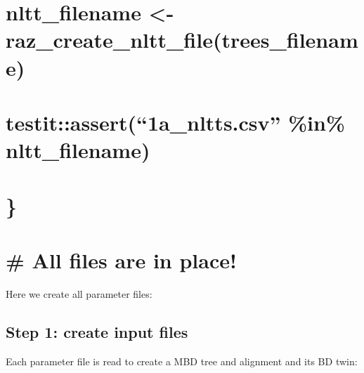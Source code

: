 \documentclass[]{article}
\newenvironment{Shaded}{\begin{snugshade}}{\end{snugshade}}
\newcommand{\KeywordTok}[1]{\textcolor[rgb]{0.13,0.29,0.53}{\textbf{#1}}}
\newcommand{\DecValTok}[1]{\textcolor[rgb]{0.00,0.00,0.81}{#1}}
\newcommand{\StringTok}[1]{\textcolor[rgb]{0.31,0.60,0.02}{#1}}
\newcommand{\ControlFlowTok}[1]{\textcolor[rgb]{0.13,0.29,0.53}{\textbf{#1}}}
\newcommand{\OperatorTok}[1]{\textcolor[rgb]{0.81,0.36,0.00}{\textbf{#1}}}
\newcommand{\NormalTok}[1]{#1}
\begin{document}
\section{nltt\_filename \textless{}-
raz\_create\_nltt\_file(trees\_filename)}\label{nltt_filename---raz_create_nltt_filetrees_filename}

\section{\texorpdfstring{testit::assert(``1a\_nltts.csv'' \%in\%
nltt\_filename)}{testit::assert(1a\_nltts.csv \%in\% nltt\_filename)}}\label{testitassert1a_nltts.csv-in-nltt_filename}

\section{\}}\label{section-7}

\section{}\label{section-8}

\section{\# All files are in place!}\label{all-files-are-in-place}

Here we create all parameter files:

\begin{Shaded}
\end{Shaded}

\subsection{Step 1: create input files}\label{step-1-create-input-files}

Each parameter file is read to create a MBD tree and alignment and its
BD twin:
\end{document}
